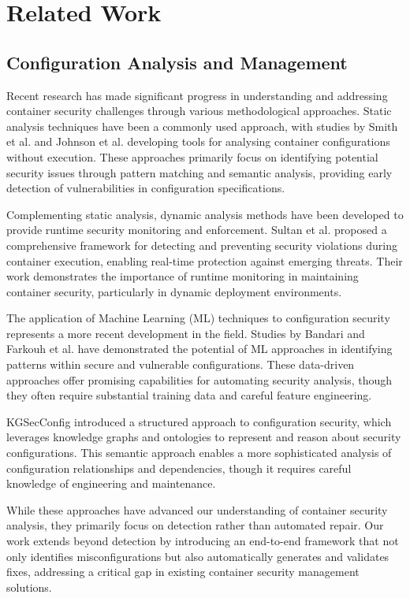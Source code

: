 \section{Related Work}
\subsection{Configuration Analysis and Management}
Recent research has made significant progress in understanding and addressing container security challenges through various methodological approaches. Static analysis techniques have been a commonly used approach, with studies by Smith et al.\cite{6987569} and Johnson et al.\cite{4534479} developing tools for analysing container configurations without execution. These approaches primarily focus on identifying potential security issues through pattern matching and semantic analysis, providing early detection of vulnerabilities in configuration specifications.

Complementing static analysis, dynamic analysis methods have been developed to provide runtime security monitoring and enforcement. Sultan et al.\cite{sultan2019container} proposed a comprehensive framework for detecting and preventing security violations during container execution, enabling real-time protection against emerging threats. Their work demonstrates the importance of runtime monitoring in maintaining container security, particularly in dynamic deployment environments.

The application of Machine Learning (ML) techniques to configuration security represents a more recent development in the field. Studies by Bandari \cite{bandari2021comprehensive} and Farkouh et al.\cite{farkouh2023intelligent} have demonstrated the potential of ML approaches in identifying patterns within secure and vulnerable configurations. These data-driven approaches offer promising capabilities for automating security analysis, though they often require substantial training data and careful feature engineering.

KGSecConfig\cite{haque2022kgsecconfig} introduced a structured approach to configuration security, which leverages knowledge graphs and ontologies to represent and reason about security configurations. This semantic approach enables a more sophisticated analysis of configuration relationships and dependencies, though it requires careful knowledge of engineering and maintenance.

While these approaches have advanced our understanding of container security analysis, they primarily focus on detection rather than automated repair. Our work extends beyond detection by introducing an end-to-end framework that not only identifies misconfigurations but also automatically generates and validates fixes, addressing a critical gap in existing container security management solutions.

